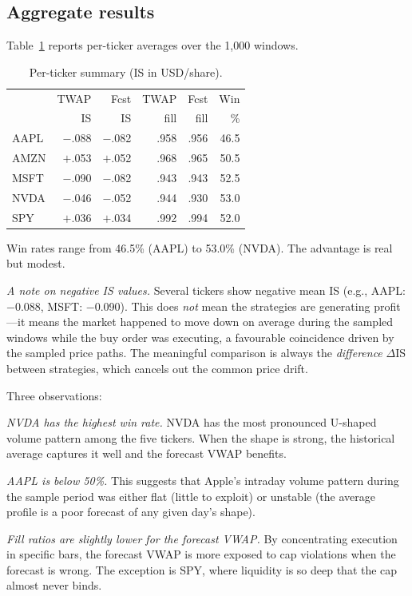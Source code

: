 \documentclass[10pt,twocolumn]{article}
\begin{document}
\subsection{Aggregate results}

Table~\ref{tab:ticker} reports per-ticker averages over the 1{,}000 windows.

\begin{table}[t]
\centering
\caption{Per-ticker summary (IS in USD/share).}
\label{tab:ticker}
\small
\begin{tabular}{@{}lrrrrr@{}}
\toprule
 & TWAP & Fcst & TWAP & Fcst & Win \\
 & IS & IS & fill & fill & \% \\
\midrule
AAPL & $-$.088 & $-$.082 & .958 & .956 & 46.5 \\
AMZN & $+$.053 & $+$.052 & .968 & .965 & 50.5 \\
MSFT & $-$.090 & $-$.082 & .943 & .943 & 52.5 \\
NVDA & $-$.046 & $-$.052 & .944 & .930 & 53.0 \\
SPY  & $+$.036 & $+$.034 & .992 & .994 & 52.0 \\
\bottomrule
\end{tabular}
\end{table}

Win rates range from 46.5\% (AAPL) to 53.0\% (NVDA). The advantage is real but modest.

\textit{A note on negative IS values.} Several tickers show negative mean IS (e.g., AAPL: $-$0.088, MSFT: $-$0.090). This does \emph{not} mean the strategies are generating profit---it means the market happened to move down on average during the sampled windows while the buy order was executing, a favourable coincidence driven by the sampled price paths. The meaningful comparison is always the \emph{difference} $\Delta$IS between strategies, which cancels out the common price drift.

Three observations:

\textit{NVDA has the highest win rate.} NVDA has the most pronounced U-shaped volume pattern among the five tickers. When the shape is strong, the historical average captures it well and the forecast VWAP benefits.

\textit{AAPL is below 50\%.} This suggests that Apple's intraday volume pattern during the sample period was either flat (little to exploit) or unstable (the average profile is a poor forecast of any given day's shape).

\textit{Fill ratios are slightly lower for the forecast VWAP.} By concentrating execution in specific bars, the forecast VWAP is more exposed to cap violations when the forecast is wrong. The exception is SPY, where liquidity is so deep that the cap almost never binds.
\end{document}
